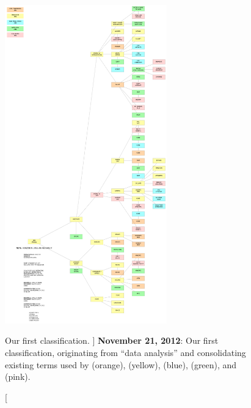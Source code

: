 
\begin{figure}
	\centering
	\includegraphics[width=0.625\textwidth]{figures/typology-12-11-21.pdf}
	\caption
	[
	    Our first classification.
	]
	{
	    {\bf November 21, 2012}: Our first  classification, originating from ``data analysis'' and consolidating existing terms used by \citet{Heer2012} (orange), \citet{Springmeyer1992} (yellow), \citet{Amar2005} (blue), \citet{Gotz2008} (green), and \citet{Chuah1996} (pink).
	}
	\centering
	\label{app:typology:fig:12.11.21}
\end{figure}


